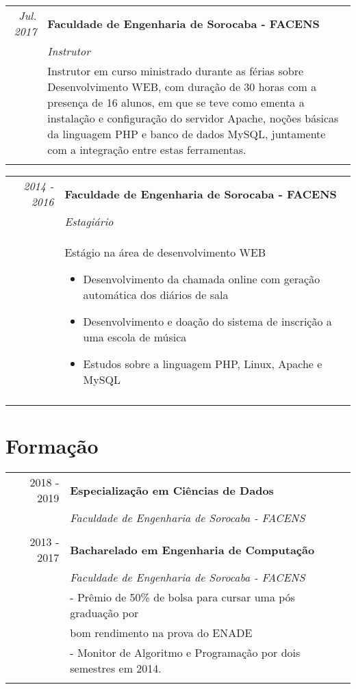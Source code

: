 \documentclass[a4paper,10pt]{article}
\begin{document}
\begin{tabular}{r|p{11cm}}
\emph{Jul. 2017} & \textbf{Faculdade de Engenharia de Sorocaba - FACENS} \\
 & \emph{\textit{Instrutor}} \\
 & \footnotesize{Instrutor em curso ministrado durante as férias sobre Desenvolvimento WEB, com duração de 30 horas com a presença de 16 alunos, em que se teve como ementa a instalação e configuração do servidor Apache, noções básicas da linguagem PHP e banco de dados MySQL, juntamente com a integração entre estas ferramentas.} \\ \multicolumn{2}{c}{} \\
\end{tabular}


\begin{tabular}{r|p{11cm}}
 \emph{2014 - 2016} & \textbf{Faculdade de Engenharia de Sorocaba - FACENS} \\
 & \emph{\textit{Estagiário}} \\
 & \footnotesize{Estágio na área de desenvolvimento WEB
  \begin{itemize}
 	\item Desenvolvimento da chamada online com geração automática dos diários de sala
 	\item Desenvolvimento e doação do sistema de inscrição a uma escola de música
 	\item Estudos sobre a linguagem PHP, Linux, Apache e MySQL
 \end{itemize}} \\ \multicolumn{2}{c}{} \\
\end{tabular}

\section{Formação}
\begin{tabular}{rl}	
 2018 - 2019 & \textbf{Especialização em Ciências de Dados} \\
& \textit{Faculdade de Engenharia de Sorocaba - FACENS} \\

\\

 2013 - 2017 & \textbf{Bacharelado em Engenharia de Computação} \\
& \textit{Faculdade de Engenharia de Sorocaba - FACENS} \\
& - Prêmio de 50\% de bolsa para cursar uma pós graduação por \\
&   bom rendimento na prova do ENADE \\
& - Monitor de Algoritmo e Programação por dois semestres em 2014.\\&\\

\end{tabular}
\end{document}
